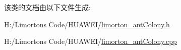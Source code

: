 该类的文档由以下文件生成\+:\begin{DoxyCompactItemize}
\item 
H\+:/\+Limorton\textquotesingle{}s Code/\+H\+U\+A\+W\+E\+I/\hyperlink{limorton__ant_colony_8h}{limorton\+\_\+ant\+Colony.\+h}\item 
H\+:/\+Limorton\textquotesingle{}s Code/\+H\+U\+A\+W\+E\+I/\hyperlink{limorton__ant_colony_8cpp}{limorton\+\_\+ant\+Colony.\+cpp}\end{DoxyCompactItemize}
